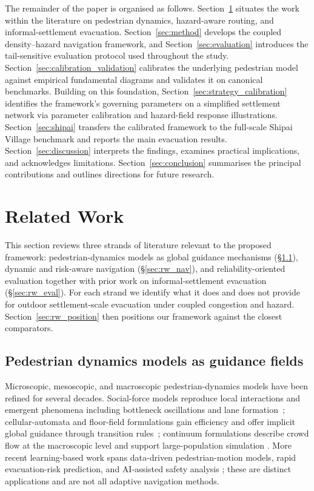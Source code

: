 \documentclass[preprint,12pt]{elsarticle}
\providecommand{\FloatBarrier}{}
\let\origsection\section
\renewcommand{\section}{\FloatBarrier\origsection}
\let\origsubsection\subsection
\renewcommand{\subsection}{\FloatBarrier\origsubsection}
\begin{document}
The remainder of the paper is organised as follows.
Section~\ref{sec:related} situates the work within the literature on
pedestrian dynamics, hazard-aware routing, and informal-settlement
evacuation.
Section~\ref{sec:method} develops the coupled density--hazard navigation
framework, and Section~\ref{sec:evaluation} introduces the tail-sensitive
evaluation protocol used throughout the study.
Section~\ref{sec:calibration_validation} calibrates the underlying
pedestrian model against empirical fundamental diagrams and validates it
on canonical benchmarks.
Building on this foundation, Section~\ref{sec:strategy_calibration}
identifies the framework's governing parameters on a simplified
    settlement network via parameter calibration and hazard-field response
    illustrations.
Section~\ref{sec:shipai} transfers the calibrated framework to the
full-scale Shipai Village benchmark and reports the main evacuation
results.
Section~\ref{sec:discussion} interprets the findings, examines
practical implications, and acknowledges limitations.
Section~\ref{sec:conclusion} summarises the principal contributions and
outlines directions for future research.




\section{Related Work}
\label{sec:related}

This section reviews three strands of literature relevant to the proposed
framework: pedestrian-dynamics models as global guidance mechanisms
(\S\ref{sec:rw_basic}), dynamic and risk-aware navigation
(\S\ref{sec:rw_nav}), and reliability-oriented evaluation together with
prior work on informal-settlement evacuation (\S\ref{sec:rw_eval}). For
each strand we identify what it does and does not provide for outdoor
settlement-scale evacuation under coupled congestion and hazard.
Section~\ref{sec:rw_position} then positions our framework against the
closest comparators.

\subsection{Pedestrian dynamics models as guidance fields}
\label{sec:rw_basic}

Microscopic, mesoscopic, and macroscopic pedestrian-dynamics models have
been refined for several decades. Social-force models reproduce local
interactions and emergent phenomena including bottleneck oscillations and
lane formation~\citep{Helbing1995SocialForce}; cellular-automata and
floor-field formulations gain efficiency and offer implicit global guidance
through transition rules~\citep{BlueAdler2001CA,Burstedde2001FloorField};
continuum formulations describe crowd flow at the macroscopic level and
support large-population simulation
\citep{Hughes2002Continuum,Treuille2006ContinuumCrowds}. More recent
learning-based work spans data-driven pedestrian-motion models,
rapid evacuation-risk prediction, and AI-assisted safety analysis
\citep{Berggold2026MLReview,Li2023ELMEvacRisk,Lu2026HumanAI}; these are
distinct applications and are not all adaptive navigation methods.
\end{document}
